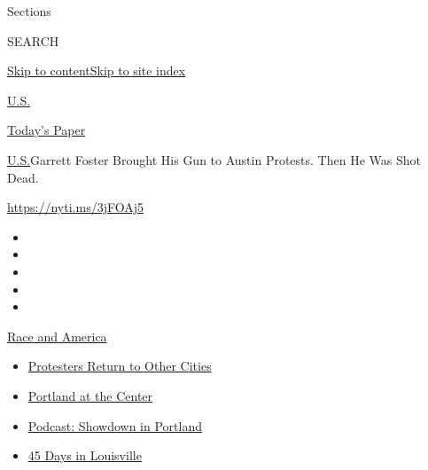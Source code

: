 Sections

SEARCH

\protect\hyperlink{site-content}{Skip to
content}\protect\hyperlink{site-index}{Skip to site index}

\href{https://www.nytimes.com/section/us}{U.S.}

\href{https://myaccount.nytimes.com/auth/login?response_type=cookie\&client_id=vi}{}

\href{https://www.nytimes.com/section/todayspaper}{Today's Paper}

\href{/section/us}{U.S.}\textbar{}Garrett Foster Brought His Gun to
Austin Protests. Then He Was Shot Dead.

\url{https://nyti.ms/3jFOAj5}

\begin{itemize}
\item
\item
\item
\item
\item
\end{itemize}

\href{https://www.nytimes.com/news-event/george-floyd-protests-minneapolis-new-york-los-angeles?action=click\&pgtype=Article\&state=default\&region=TOP_BANNER\&context=storylines_menu}{Race
and America}

\begin{itemize}
\tightlist
\item
  \href{https://www.nytimes.com/2020/07/26/us/protests-portland-seattle-trump.html?action=click\&pgtype=Article\&state=default\&region=TOP_BANNER\&context=storylines_menu}{Protesters
  Return to Other Cities}
\item
  \href{https://www.nytimes.com/2020/07/24/us/portland-oregon-protests-white-race.html?action=click\&pgtype=Article\&state=default\&region=TOP_BANNER\&context=storylines_menu}{Portland
  at the Center}
\item
  \href{https://www.nytimes.com/2020/07/23/podcasts/the-daily/portland-protests.html?action=click\&pgtype=Article\&state=default\&region=TOP_BANNER\&context=storylines_menu}{Podcast:
  Showdown in Portland}
\item
  \href{https://www.nytimes.com/interactive/2020/07/16/us/black-lives-matter-protests-louisville-breonna-taylor.html?action=click\&pgtype=Article\&state=default\&region=TOP_BANNER\&context=storylines_menu}{45
  Days in Louisville}
\end{itemize}

